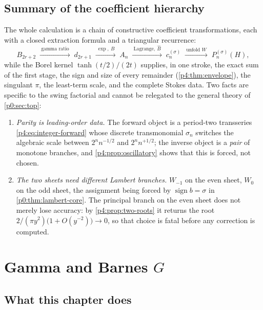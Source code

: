 \documentclass[11pt,a4paper,oneside]{book}
\theoremstyle{plain}
\theoremstyle{definition}
\theoremstyle{remark}
\newcommand{\OB}{\widehat{B}}
\newcommand{\EB}{B}
\newcommand{\Wlam}{W}
\begin{document}
\section{Summary of the coefficient hierarchy}
\label{p4:sec:summary}

The whole calculation is a chain of constructive coefficient transformations,
each with a closed extraction formula and a triangular recurrence:
\begin{equation}
  \boxed{\;
  B_{2r+2}
  \;\xrightarrow{\ \text{gamma ratio}\ }\;
  d_{2r+1}
  \;\xrightarrow{\ \exp,\ \EB\ }\;
  A_n
  \;\xrightarrow{\ \text{Lagrange},\ \OB\ }\;
  c^{(\sigma)}_n
  \;\xrightarrow{\ \text{unfold }\Wlam\ }\;
  P^{(\sigma)}_n(H),\;}
  \label{p4:eq:hierarchy}
\end{equation}
while the Borel kernel $\tanh(t/2)/(2t)$ supplies, in one stroke, the exact
sum of the first stage, the sign and size of every remainder
(\cref{p4:thm:envelope}), the singulant $\pi$, the least-term scale, and the
complete Stokes data.  Two facts are specific to the swing factorial and
cannot be relegated to the general theory of \cref{p0:sec:top}:

\begin{enumerate}
\item \emph{Parity is leading-order data.}  The forward object is a
period-two transseries \cref{p4:eq:integer-forward} whose discrete
transmonomial $\sigma_n$ switches the algebraic scale between $2^{n}n^{-1/2}$
and $2^{n}n^{+1/2}$; the inverse object is a \emph{pair} of monotone branches,
and \cref{p4:prop:oscillatory} shows that this is forced, not chosen.
\item \emph{The two sheets need different Lambert branches.}  $\Wlam_{-1}$ on
the even sheet, $\Wlam_0$ on the odd sheet, the assignment being forced by
$\operatorname{sign}b=\sigma$ in \cref{p0:thm:lambert-core}.  The principal
branch on the even sheet does not merely lose accuracy: by
\cref{p4:prop:two-roots} it returns the root
$2/(\pi y^{2})\bigl(1+O(y^{-2})\bigr)\to0$, so that choice is fatal before any
correction is computed.
\end{enumerate}

\chapter{Gamma and Barnes \texorpdfstring{$G$}{G}}
\label{p6:sec:top}

\section{What this chapter does}
\label{p6:sec:intro}
\end{document}
